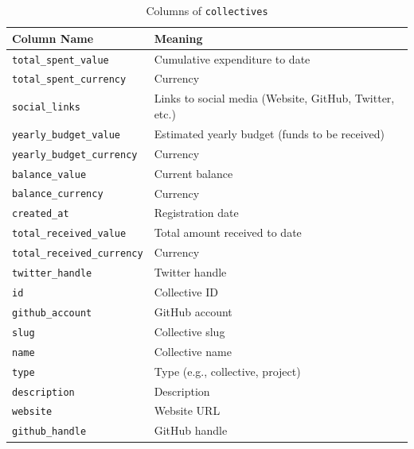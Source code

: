 \documentclass[11pt]{ist-thesis-lt}
\begin{document}
\begin{table}[htbp]
    \centering
    \caption{Columns of \texttt{collectives}}\label{tab:collectives-columns}
    \begin{tabular}{ll}
        \toprule
        Column Name & Meaning \\
        \midrule
        \texttt{total\_spent\_value}     & Cumulative expenditure to date \\
        \texttt{total\_spent\_currency}  & Currency \\
        \texttt{social\_links}           & Links to social media (Website, GitHub, Twitter, etc.) \\
        \texttt{yearly\_budget\_value}   & Estimated yearly budget (funds to be received) \\
        \texttt{yearly\_budget\_currency}& Currency \\
        \texttt{balance\_value}          & Current balance \\
        \texttt{balance\_currency}       & Currency \\
        \texttt{created\_at}             & Registration date \\
        \texttt{total\_received\_value}  & Total amount received to date \\
        \texttt{total\_received\_currency}& Currency \\
        \texttt{twitter\_handle}         & Twitter handle \\
        \texttt{id}                      & Collective ID \\
        \texttt{github\_account}         & GitHub account \\
        \texttt{slug}                    & Collective slug \\
        \texttt{name}                    & Collective name \\
        \texttt{type}                    & Type (e.g., collective, project) \\
        \texttt{description}             & Description \\
        \texttt{website}                 & Website URL \\
        \texttt{github\_handle}          & GitHub handle \\
        \bottomrule
    \end{tabular}
\end{table}
\end{document}

